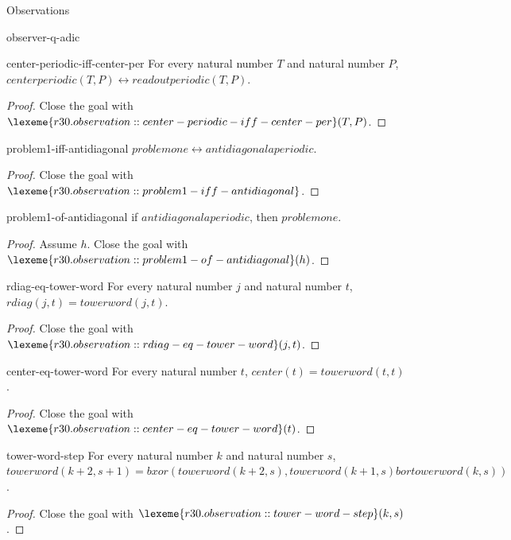 \begin{lexlean}{Observations}
\begin{section}{observer-q-adic}
\begin{theorem}{center-periodic-iff-center-per}
For every natural number \(T\) and natural number \(P\), \(centerperiodic(T, P) ↔ readoutperiodic(T, P)\).
\begin{proof}
Close the goal with \(\lexeme{r30.observation::center-periodic-iff-center-per}(T, P)\).
\end{proof}
\end{theorem}

\begin{theorem}{problem1-iff-antidiagonal}
\(problemone ↔ antidiagonalaperiodic\).
\begin{proof}
Close the goal with \(\lexeme{r30.observation::problem1-iff-antidiagonal}\).
\end{proof}
\end{theorem}

\begin{theorem}{problem1-of-antidiagonal}
if \(antidiagonalaperiodic\), then \(problemone\).
\begin{proof}
Assume \(h\).
Close the goal with \(\lexeme{r30.observation::problem1-of-antidiagonal}(h)\).
\end{proof}
\end{theorem}

\begin{theorem}{rdiag-eq-tower-word}
For every natural number \(j\) and natural number \(t\), \(rdiag(j, t) = towerword(j, t)\).
\begin{proof}
Close the goal with \(\lexeme{r30.observation::rdiag-eq-tower-word}(j, t)\).
\end{proof}
\end{theorem}

\begin{theorem}{center-eq-tower-word}
For every natural number \(t\), \(center(t) = towerword(t, t)\).
\begin{proof}
Close the goal with \(\lexeme{r30.observation::center-eq-tower-word}(t)\).
\end{proof}
\end{theorem}

\begin{theorem}{tower-word-step}
For every natural number \(k\) and natural number \(s\), \(towerword(k + 2, s + 1) = bxor(towerword(k + 2, s), towerword(k + 1, s) bor towerword(k, s))\).
\begin{proof}
Close the goal with \(\lexeme{r30.observation::tower-word-step}(k, s)\).
\end{proof}
\end{theorem}


\end{section}
\end{lexlean}
